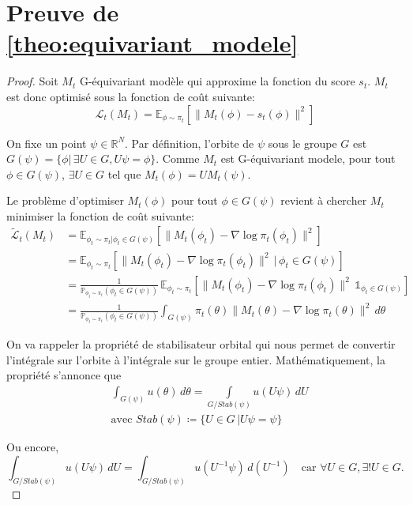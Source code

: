 \documentclass[a4paper,10pt]{article}
\theoremstyle{definition} %
\theoremstyle{definition} %
\theoremstyle{definition} %
\theoremstyle{definition} %
\newcommand{\todo}[1]{\textcolor{red}{\textbf{TODO:} #1}}
\begin{document}
\section{Preuve de \cref{theo:equivariant_modele}}\label{sec:proof_equivariant_modele}
\begin{proof}
Soit $M_t$ G-équivariant modèle qui approxime la fonction du score $s_t$. $M_t$ est donc optimisé sous la fonction de coût suivante:
\[
\mathcal{L}_t(M_t) = \mathbb{E}_{\phi \sim \pi_t} \left[ \| M_t(\phi) - s_t(\phi) \|^2 \right]
\]

On fixe un point $\psi \in \mathbb{R}^N$. Par définition, l'orbite de $\psi$ sous le groupe $G$ est $G(\psi) = \{ \phi |\, \exists U \in G, U \psi = \phi \}$. Comme $M_t$ est G-équivariant modele, pour tout $\phi \in G(\psi)$, $\exists U \in G$ tel que $M_t(\phi) = U M_t(\psi)$.

Le problème d'optimiser $M_t(\phi)$ pour tout $\phi \in G(\psi)$ revient à chercher $M_t$ minimiser la fonction de coût suivante:
\begin{align*}
\widetilde{\mathcal{L}}_t(M_t) &= \mathbb{E}_{\phi_t \sim \pi_t | \phi_t \in G(\psi)} \left[ \| M_t(\phi_t) - \nabla \log \pi_t(\phi_t) \|^2 \right]\\ 
&= \mathbb{E}_{\phi_t \sim \pi_t} \left[ \| M_t(\phi_t) - \nabla \log \pi_t(\phi_t) \|^2 \,|\, \phi_t \in G(\psi) \right] \\
&= \frac{1}{\mathbb{P}_{\phi_t \sim \pi_t} (\phi_t \in G(\psi))}\,\mathbb{E}_{\phi_t \sim \pi_t} \left[ \| M_t(\phi_t) - \nabla \log \pi_t(\phi_t) \|^2\, \mathbb{1}_{\phi_t \in G(\psi)} \right] \\
&= \frac{1}{\mathbb{P}_{\phi_t \sim \pi_t} (\phi_t \in G(\psi))} \int_{G(\psi)} \pi_t(\theta) \| M_t(\theta) - \nabla \log \pi_t(\theta) \|^2 \, d\theta
\end{align*}

On va rappeler la propriété de stabilisateur orbital qui nous permet de convertir l'intégrale sur l'orbite à l'intégrale sur le groupe entier. Mathématiquement, la propriété s'annonce que  
\begin{align*}
    & \int_{G(\psi)} u(\theta) \, d\theta = \int\limits_{G/Stab(\psi)} u(U\psi) \, dU\\
    & \text{avec } Stab(\psi) \coloneqq \{U\in G \, | U\psi = \psi\}
\end{align*}


Ou encore,
\[
\int_{G/Stab(\psi)} u(U\psi) \, dU = \int_{G/Stab(\psi)} u(U^{-1}\psi) \, d(U^{-1}) \quad \text{car } \forall U \in G, \exists ! U \in G.
\]


\end{proof}
\end{document}
